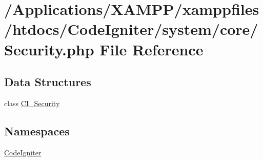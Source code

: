 \hypertarget{_security_8php}{}\section{/\+Applications/\+X\+A\+M\+P\+P/xamppfiles/htdocs/\+Code\+Igniter/system/core/\+Security.php File Reference}
\label{_security_8php}
\subsection*{Data Structures}
\begin{DoxyCompactItemize}
\item 
class \mbox{\hyperlink{class_c_i___security}{C\+I\+\_\+\+Security}}
\end{DoxyCompactItemize}
\subsection*{Namespaces}
\begin{DoxyCompactItemize}
\item 
 \mbox{\hyperlink{namespace_code_igniter}{Code\+Igniter}}
\end{DoxyCompactItemize}

